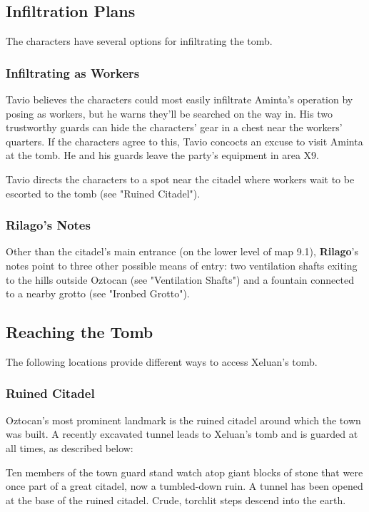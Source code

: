 \documentclass[10pt,a4paper,twoside,bg=print,twocolumn,openany,nodeprecatedcode]{dndbook}
\begin{document}
\subsection{Infiltration Plans}
The characters have several options for infiltrating the tomb.

\subsubsection{Infiltrating as Workers}
Tavio believes the characters could most easily infiltrate Aminta's operation by posing as workers, but he warns they'll be searched on the way in. His two trustworthy guards can hide the characters' gear in a chest near the workers' quarters. If the characters agree to this, Tavio concocts an excuse to visit Aminta at the tomb. He and his guards leave the party's equipment in area X9.

Tavio directs the characters to a spot near the citadel where workers wait to be escorted to the tomb (see "Ruined Citadel").

\subsubsection{Rilago's Notes}
Other than the citadel's main entrance (on the lower level of map 9.1), \textbf{Rilago}'s notes point to three other possible means of entry: two ventilation shafts exiting to the hills outside Oztocan (see "Ventilation Shafts") and a fountain connected to a nearby grotto (see "Ironbed Grotto").

\subsection{Reaching the Tomb}
The following locations provide different ways to access Xeluan's tomb.

\subsubsection{Ruined Citadel}
Oztocan's most prominent landmark is the ruined citadel around which the town was built. A recently excavated tunnel leads to Xeluan's tomb and is guarded at all times, as described below:

\begin{DndReadAloud}{}
Ten members of the town guard stand watch atop giant blocks of stone that were once part of a great citadel, now a tumbled-down ruin. A tunnel has been opened at the base of the ruined citadel. Crude, torchlit steps descend into the earth.

\end{DndReadAloud}
\end{document}
